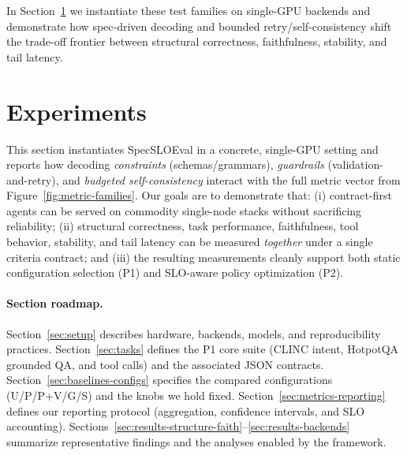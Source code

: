 \medskip
In Section~\ref{sec:experiments} we instantiate these test families on single-GPU backends and demonstrate how spec-driven decoding and bounded retry/self-consistency shift the trade-off frontier between structural correctness, faithfulness, stability, and tail latency.

\section{Experiments}
\label{sec:experiments}

This section instantiates SpecSLOEval in a concrete, single-GPU setting and reports how decoding \emph{constraints} (schemas/grammars), \emph{guardrails} (validation-and-retry), and \emph{budgeted self-consistency} interact with the full metric vector from Figure~\ref{fig:metric-families}.
Our goals are to demonstrate that:
(i) contract-first agents can be served on commodity single-node stacks without sacrificing reliability;
(ii) structural correctness, task performance, faithfulness, tool behavior, stability, and tail latency can be measured \emph{together} under a single criteria contract; and
(iii) the resulting measurements cleanly support both static configuration selection (P1) and SLO-aware policy optimization (P2).

\paragraph{Section roadmap.}
Section~\ref{sec:setup} describes hardware, backends, models, and reproducibility practices.
Section~\ref{sec:tasks} defines the P1 core suite (CLINC intent, HotpotQA grounded QA, and tool calls) and the associated JSON contracts.
Section~\ref{sec:baselines-configs} specifies the compared configurations (U/P/P+V/G/S) and the knobs we hold fixed.
Section~\ref{sec:metrics-reporting} defines our reporting protocol (aggregation, confidence intervals, and SLO accounting).
Sections~\ref{sec:results-structure-faith}--\ref{sec:results-backends} summarize representative findings and the analyses enabled by the framework.

